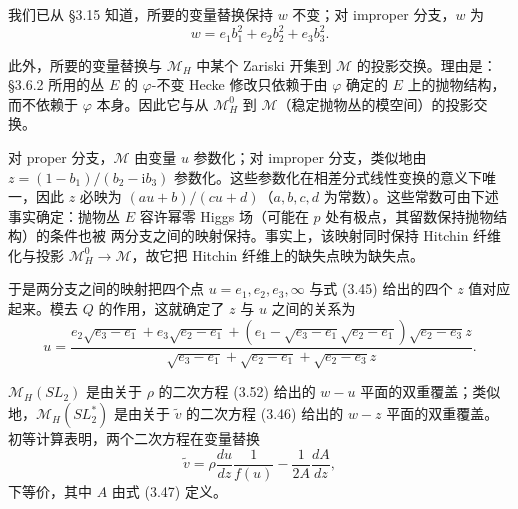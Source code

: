 我们已从 §3.15 知道，所要的变量替换保持 $w$ 不变；对 improper 分支，$w$ 为
\begin{equation}\tag{3.54}
w=e_1b_1^2+e_2b_2^2+e_3b_3^2.
\end{equation}

此外，所要的变量替换与 $\mathcal{M}_H$ 中某个 Zariski 开集到 $\mathcal{M}$ 的投影交换。理由是：§3.6.2 所用的丛 $E$ 的 $\varphi$-不变 Hecke 修改只依赖于由 $\varphi$ 确定的 $E$ 上的抛物结构，而不依赖于 $\varphi$ 本身。因此它与从 $\mathcal{M}_H^0$ 到 $\mathcal{M}$（稳定抛物丛的模空间）的投影交换。

对 proper 分支，$\mathcal{M}$ 由变量 $u$ 参数化；对 improper 分支，类似地由 $z=(1-b_1)/(b_2-\mathrm{i}b_3)$ 参数化。这些参数化在相差分式线性变换的意义下唯一，因此 $z$ 必映为 $(au+b)/(cu+d)$（$a,b,c,d$ 为常数）。这些常数可由下述事实确定：抛物丛 $E$ 容许幂零 Higgs 场（可能在 $p$ 处有极点，其留数保持抛物结构）的条件也被
两分支之间的映射保持。事实上，该映射同时保持 Hitchin 纤维化与投影 $\mathcal{M}_H^0\to\mathcal{M}$，故它把 Hitchin 纤维上的缺失点映为缺失点。

于是两分支之间的映射把四个点 $u=e_1,e_2,e_3,\infty$ 与式 (3.45) 给出的四个 $z$ 值对应起来。模去 $Q$ 的作用，这就确定了 $z$ 与 $u$ 之间的关系为
\begin{equation}\tag{3.55}
u=\frac{e_2\sqrt{e_3-e_1}+e_3\sqrt{e_2-e_1}+(e_1-\sqrt{e_3-e_1}\sqrt{e_2-e_1})\sqrt{e_2-e_3}z}{\sqrt{e_3-e_1}+\sqrt{e_2-e_1}+\sqrt{e_2-e_3}z}.
\end{equation}

$\mathcal{M}_H(SL_2)$ 是由关于 $\rho$ 的二次方程 (3.52) 给出的 $w-u$ 平面的双重覆盖；类似地，$\mathcal{M}_H(SL_2^*)$ 是由关于 $\tilde v$ 的二次方程 (3.46) 给出的 $w-z$ 平面的双重覆盖。初等计算表明，两个二次方程在变量替换
\begin{equation}\tag{3.56}
\tilde v=\rho\frac{du}{dz}\frac{1}{f(u)}-\frac{1}{2A}\frac{dA}{dz},
\end{equation}
下等价，其中 $A$ 由式 (3.47) 定义。

